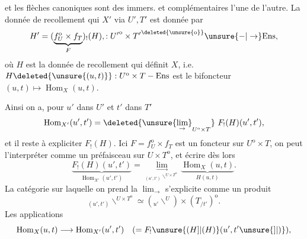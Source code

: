 et les flèches canoniques
sont des immers.  et  complémentaires
l'une de l'autre. La donnée de recollement
qui  $X'$ via $U',T'$ est donnée par
\[
H'=(\underbrace{f_U^{\mathrm o}\times f_T}_{F})_!(H),:
{U'}^{\mathrm o}\times {T'}^{\deleted{\unsure{\mathrm o}}}\unsure{-|\to}\mathrm{Ens},
\]
où $H$ est la donnée de recollement qui définit
$X$, i.e. $H\deleted{\unsure{(u,t)}}:U^{\mathrm o}\times T-\mathrm{Ens}$ est le bifoncteur
$(u,t)\mapsto\operatorname{Hom}_X(u,t)$.

Ainsi on a, pour $u'$ dans $U'$ et $t'$ dans $T'$
\[
\operatorname{Hom}_{X'}(u',t')=\deleted{\unsure{\lim_{\rightarrow}}_{U^{\mathrm o}\times T}}\ F_!(H)(u',t'),
\]
et il reste à expliciter $F_!(H)$. Ici 
$F=f_U^{\mathrm o}\times f_T$ est un foncteur  sur $U^{\mathrm o}\times T$,
on peut l'interpréter comme un préfaisceau sur
 $U\times T^{\mathrm o}$, et écrire dès lors
\[
\underbrace{F_!(H)(u',t')}_{\operatorname{Hom}_{X'}(u',t')}
=\underset{{}_{(u',t')}\backslash^{U\times T^{\mathrm o}}}{\lim_{\rightarrow}}
\underbrace{\operatorname{Hom}_X(u,t)}_{H(u,t)}.\tag*{(*)}
\]
La catégorie  sur laquelle on prend la $\lim_{\rightarrow}$
s'explicite comme un produit
\[
{}_{(u',t')}\backslash^{U\times T^{\mathrm o}}\simeq
({}_{u'}\backslash^{U})\times(T_{/t'})^{\mathrm o}.
\]
Les applications
\[
\operatorname{Hom}_X(u,t)\longrightarrow\operatorname{Hom}_{X'}(u',t')
\quad(=F_!\unsure{(H]|(H)}(u',t'\unsure{]|)}),
\]
